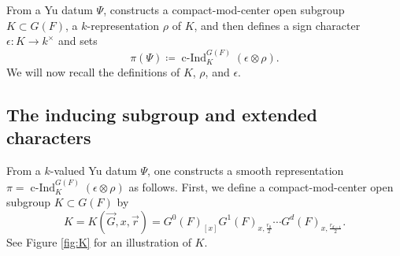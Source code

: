 \documentclass[reqno]{amsart}
\numberwithin{equation}{subsection}
\newcommand{\co}{\colon}
\DeclareMathOperator{\cInd}{c-Ind}
\theoremstyle{remark}
\numberwithin{equation}{subsection}
\numberwithin{figure}{subsection}
\begin{document}
From a Yu datum $\Psi$, \cite{Yu01} constructs a compact-mod-center open subgroup $K \subset G(F)$, a $k$-representation $\rho$ of $K$, and then \cite{FKS23} defines a sign character $\epsilon\co K \to k^\times$ and sets
\[
\pi(\Psi) \coloneqq \cInd_K^{G(F)}(\epsilon \otimes \rho).
\]
We will now recall the definitions of $K$, $\rho$, and $\epsilon$.

\subsection{The inducing subgroup and extended characters}\label{sss:yu-characters}
From a $k$-valued Yu datum $\Psi$, one constructs a smooth representation $\pi=\cInd_K^{G(F)}(\epsilon\otimes\rho)$ as follows. First, we define a compact-mod-center open subgroup $K \subset G(F)$ by
\begin{equation}\label{eq:K}
K = K(\vec{G}, x, \vec{r}) = G^0(F)_{[x]}G^1(F)_{x, \frac{r_0}{2}} \cdots G^d(F)_{x, \frac{r_{d-1}}{2}}.
\end{equation}
See Figure \ref{fig:K} for an illustration of $K$.
\end{document}
